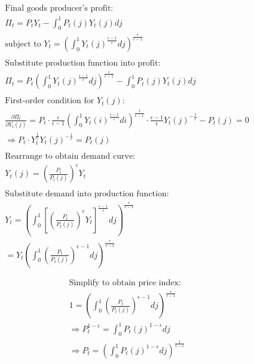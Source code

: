 \documentclass[11pt,preprint]{elsarticle}
\numberwithin{equation}{section}
\numberwithin{figure}{section}
\numberwithin{table}{section}
\begin{document}
\begin{align*}  
& \text{Final goods producer's profit:} \\  
& \Pi_t = P_t Y_t - \int_0^1 P_t(j) Y_t(j)  dj \\  
& \text{subject to } Y_t = \left( \int_0^1 Y_t(j)^{\frac{\epsilon-1}{\epsilon}}  dj \right)^{\frac{\epsilon}{\epsilon-1}} \\  
& \\  
& \text{Substitute production function into profit:} \\  
& \Pi_t = P_t \left( \int_0^1 Y_t(j)^{\frac{\epsilon-1}{\epsilon}}  dj \right)^{\frac{\epsilon}{\epsilon-1}} - \int_0^1 P_t(j) Y_t(j)  dj \\  
& \\  
& \text{First-order condition for } Y_t(j): \\  
& \frac{\partial \Pi_t}{\partial Y_t(j)} = P_t \cdot \frac{\epsilon}{\epsilon-1} \left( \int_0^1 Y_t(i)^{\frac{\epsilon-1}{\epsilon}}  di \right)^{\frac{1}{\epsilon-1}} \cdot \frac{\epsilon-1}{\epsilon} Y_t(j)^{-\frac{1}{\epsilon}} - P_t(j) = 0 \\  
& \Rightarrow P_t \cdot Y_t^{\frac{1}{\epsilon}} Y_t(j)^{-\frac{1}{\epsilon}} = P_t(j) \\  
& \\  
& \text{Rearrange to obtain demand curve:} \\  
& Y_t(j) = \left( \frac{P_t}{P_t(j)} \right)^{\epsilon} Y_t \\  
& \\  
& \text{Substitute demand into production function:} \\  
& Y_t = \left( \int_0^1 \left[ \left( \frac{P_t}{P_t(j)} \right)^{\epsilon} Y_t \right]^{\frac{\epsilon-1}{\epsilon}}  dj \right)^{\frac{\epsilon}{\epsilon-1}} \\  
& = Y_t \left( \int_0^1 \left( \frac{P_t}{P_t(j)} \right)^{\epsilon-1}  dj \right)^{\frac{\epsilon}{\epsilon-1}} \\  
& \\
\end{align*} \begin{align*} 
& \text{Simplify to obtain price index:} \\  
& 1 = \left( \int_0^1 \left( \frac{P_t}{P_t(j)} \right)^{\epsilon-1}  dj \right)^{\frac{\epsilon}{\epsilon-1}} \\  
& \Rightarrow P_t^{1-\epsilon} = \int_0^1 P_t(j)^{1-\epsilon}  dj \\  
& \Rightarrow P_t = \left( \int_0^1 P_t(j)^{1-\epsilon}  dj \right)^{\frac{1}{1-\epsilon}}  
\end{align*}
\end{document}
